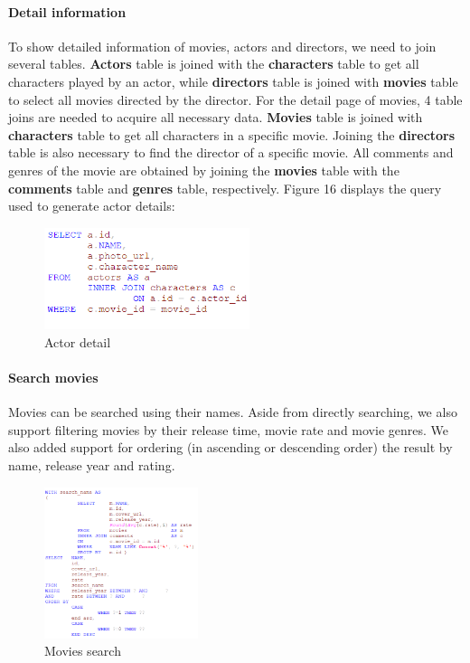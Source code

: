\begin{CJK*}{UTF8}{gbsn}
\paragraph{Detail information} To show detailed information of movies, actors and directors, we need to join several tables. \textbf{Actors} table is joined with the \textbf{characters} table to get all characters played by an actor, while \textbf{directors} table is joined with \textbf{movies} table to select all movies directed by the director. For the detail page of movies, 4 table joins are needed to acquire all necessary data. \textbf{Movies} table is joined with \textbf{characters} table to get all characters in a specific movie. Joining the \textbf{directors} table is also necessary to find the director of a specific movie. All comments and genres of the movie are obtained by joining the \textbf{movies} table with the \textbf{comments} table and \textbf{genres} table, respectively. Figure 16 displays the query used to generate actor details:

\begin{figure}[htbp]
\centering
\includegraphics[width=6cm]{a_detail.png}
\caption{Actor detail}
\end{figure}

\paragraph{Search movies}
Movies can be searched using their names. Aside from directly searching, we also support filtering movies by their release time, movie rate and movie genres. We also added support for ordering (in ascending or descending order) the result by name, release year and rating.
\begin{figure}[htbp]
\centering
\includegraphics[width=0.4\textwidth]{m_search.png}
\caption{Movies search}
\end{figure}

\end{CJK*}
